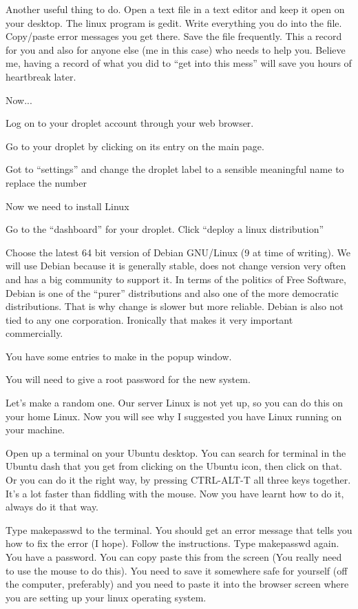 \documentclass[12pt,a4paper]{article}
\begin{document}
Another useful thing to do. Open a text file in a text editor and keep it open on your desktop. The linux program is gedit. Write everything you do into the file. Copy/paste error messages you get there. Save the file frequently. This a record for you and also for anyone else (me in this case) who needs to help you. Believe me, having a record of what you did to “get into this mess” will save you hours of heartbreak later. 

Now...

Log on to your droplet account through your web browser.

Go to your droplet by clicking on its entry on the main page.

Got to “settings” and change the droplet label to a sensible meaningful name to replace the number

Now we need to install Linux 

Go to the “dashboard” for your droplet. Click “deploy a linux distribution”

Choose the latest 64 bit version of Debian GNU/Linux (9 at time of writing). We will use Debian because it is generally stable, does not change version very often and has a big community to support it.  In terms of the politics of Free Software, Debian is one of the “purer” distributions and also one of the more democratic distributions. That is why change is slower but more reliable. Debian is also not tied to any one corporation. Ironically that makes it very important commercially.

You have some entries to make in the popup window.

You will need to give a root password for the new system. 

Let’s make a random one. Our server Linux is not yet up, so you can do this on your home Linux. Now you will see why I suggested you have Linux running on your machine.

Open up a terminal on your Ubuntu desktop. You can search for terminal in the Ubuntu dash that you get from clicking on the Ubuntu icon, then click on that. Or you can do it the right way, by pressing CTRL-ALT-T all three keys together. It’s a lot faster than fiddling with the mouse. Now you have learnt how to do it, always do it that way.  

Type makepasswd to the terminal. You should get an error message that tells you how to fix the error (I hope). Follow the instructions. Type makepasswd again. You have a password. You can copy paste this from the screen (You really need to use the mouse to do this). You need to save it somewhere safe for yourself (off the computer, preferably) and you need to paste it into the browser screen where you are setting up your linux operating system.
\end{document}
